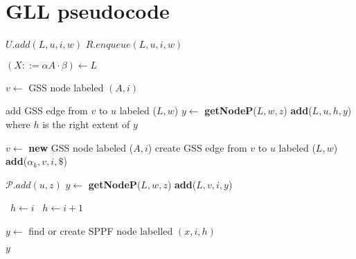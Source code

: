 \appendix

\section{GLL pseudocode}\label{GLLCode}
\begin{algorithmic}
    \State $U.add(L,u,i,w)$
    \State $R.enqueue(L,u,i,w)$
    \EndIf
    \EndFunction
\end{algorithmic}

\begin{algorithmic}    
    \State $(X ::= \alpha A \cdot \beta) \gets L$
    
    \State $v \gets$ GSS node labeled $(A, i)$
    
    \State add GSS edge from $v$ to $u$ labeled ($L,w$)
    \State $y \gets$ \textbf{getNodeP}($L,w,z$)
    \State \textbf{add}($L, u, h, y$) where $h$ is the right extent of $y$
    \EndFor
    \EndIf
    
    \Else
    \State $v \gets$ \textbf{new} GSS node labeled ($A, i$)
    \State create GSS edge from $v$ to $u$ labeled ($L, w$)
    \State \textbf{add}($\alpha_{k}, v, i, \$ $)
    \EndFor
    \EndIf
    \EndFunction
\end{algorithmic}

\begin{algorithmic}   
    \State $\mathcal{P}.add(u,z)$
    \State $y \gets$ \textbf{getNodeP}($L, w, z$)
    \State \textbf{add}($L,v,i,y$)
    \EndFor
    \EndIf
    \EndFunction
\end{algorithmic}

\begin{algorithmic}   
    \  $h \gets i$
    \Else
    \  $h \gets i + 1$
    \EndIf
    
    \State $y \gets$ find or create SPPF node labelled $(x, i, h)$
    
    \Return $y$
    
    \EndFunction
\end{algorithmic}

